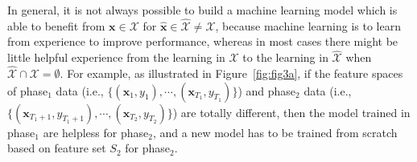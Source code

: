 \documentclass[review,11pt]{ReportTemplate}
\begin{document}
In general, it is not always possible to build a machine learning model which is able to benefit from $\bm{x} \in \mathcal{X}$ for $\hat{\bm{x}} \in \hat{\mathcal{X}} \neq \mathcal{X}$, because machine learning is to learn from experience to improve performance, whereas in most cases there might be little helpful experience from the learning in $\mathcal{X}$ to the learning in $\hat{\mathcal{X}}$ when $\hat{\mathcal{X}} \cap \mathcal{X} = \emptyset$. For example, as illustrated in Figure~\ref{fig:fig3a}, if the feature spaces of phase$_1$ data (i.e., $\{(\bm{x}_1, y_1), \cdots, (\bm{x}_{T_1}, y_{T_1})\}$) and phase$_2$ data (i.e., $\{(\bm{x}_{T_1+1}, y_{T_1+1}), \cdots, (\bm{x}_{T_2}, y_{T_2})\}$) are totally different, then the model trained in phase$_1$ are helpless for phase$_2$, and a new model has to be trained from scratch based on feature set $S_2$ for phase$_2$.
\end{document}
